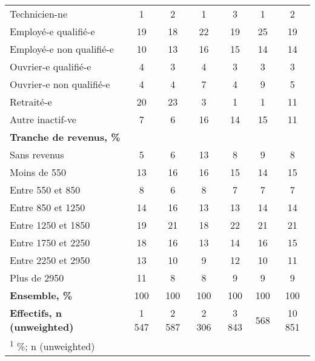 \documentclass[
  12pt,
]{book}
\begin{document}
\begin{table}[!h]
{\begin{threeparttable}
\begin{tabular}[t]{lcccccc}
\hspace{1em}Technicien-ne & 1 & 2 & 1 & 3 & 1 & 2\\
\hspace{1em}Employé-e qualifié-e & 19 & 18 & 22 & 19 & 25 & 19\\
\addlinespace
\hspace{1em}Employé-e non qualifié-e & 10 & 13 & 16 & 15 & 14 & 14\\
\hspace{1em}Ouvrier-e qualifié-e & 4 & 3 & 4 & 3 & 3 & 3\\
\hspace{1em}Ouvrier-e non qualifié-e & 4 & 4 & 7 & 4 & 9 & 5\\
\hspace{1em}Retraité-e & 20 & 23 & 3 & 1 & 1 & 11\\
\hspace{1em}Autre inactif-ve & 7 & 6 & 16 & 14 & 15 & 11\\
\addlinespace
\textbf{Tranche de revenus, \%} &  &  &  &  &  & \\
\hspace{1em}Sans revenus & 5 & 6 & 13 & 8 & 9 & 8\\
\hspace{1em}Moins de 550 & 13 & 16 & 16 & 15 & 14 & 15\\
\hspace{1em}Entre 550 et 850 & 8 & 6 & 8 & 7 & 7 & 7\\
\hspace{1em}Entre 850 et 1250 & 14 & 16 & 13 & 13 & 14 & 14\\
\addlinespace
\hspace{1em}Entre 1250 et 1850 & 19 & 21 & 18 & 22 & 21 & 21\\
\hspace{1em}Entre 1750 et 2250 & 18 & 16 & 13 & 14 & 16 & 15\\
\hspace{1em}Entre 2250 et 2950 & 13 & 10 & 9 & 12 & 10 & 11\\
\hspace{1em}Plus de 2950 & 11 & 8 & 8 & 9 & 9 & 9\\
\textbf{Ensemble, \%} & 100 & 100 & 100 & 100 & 100 & 100\\
\addlinespace
\textbf{Effectifs, n (unweighted)} & 1 547 & 2 587 & 2 306 & 3 843 & 568 & 10 851\\
\bottomrule
\multicolumn{7}{l}{\rule{0pt}{1em}\textsuperscript{1} \%; n (unweighted)}\\
\end{tabular}

\end{threeparttable}}
\end{table}
\end{document}

